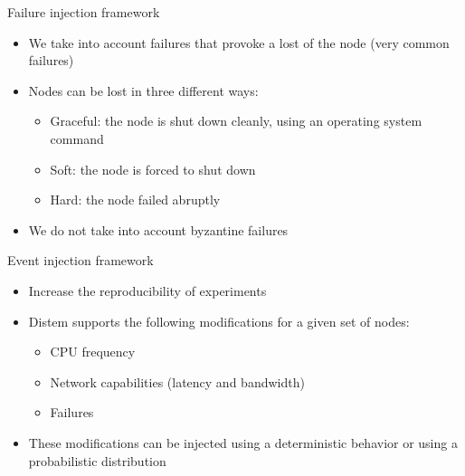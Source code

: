 \documentclass[11pt,xcolor=dvipsnames,presentation]{beamer}
\begin{document}
\begin{frame}[label=sec-3-0-6]{Failure injection framework}

\begin{itemize}
\item We take into account failures that provoke a lost of the node (very common failures)

\item Nodes can be lost in three different ways:

\begin{itemize}
\item \alert{Graceful}: the node is shut down cleanly, using an operating system command
\item \alert{Soft}: the node is forced to shut down
\item \alert{Hard}: the node failed abruptly
\end{itemize}

\item We do not take into account byzantine failures
\end{itemize}
\end{frame}

\begin{frame}[label=sec-3-0-7]{Event injection framework}
\begin{itemize}
\item Increase the reproducibility of experiments
\item Distem supports the following modifications for a given set of nodes:
\begin{itemize}
\item CPU frequency
\item Network capabilities (latency and bandwidth)
\item Failures
\end{itemize}
\item These modifications can be injected using a deterministic behavior or using
a probabilistic distribution
\end{itemize}
\end{frame}
\end{document}
